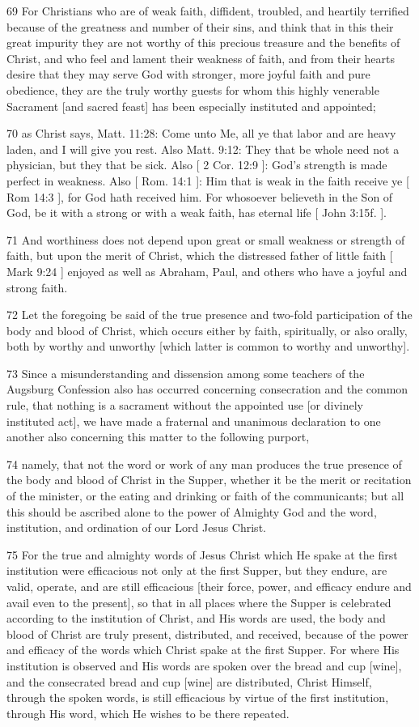 69 For Christians who are of weak faith, diffident, troubled, and heartily terrified because of the greatness and number of their sins, and think that in this their great impurity they are not worthy of this precious treasure and the benefits of Christ, and who feel and lament their weakness of faith, and from their hearts desire that they may serve God with stronger, more joyful faith and pure obedience, they are the truly worthy guests for whom this highly venerable Sacrament [and sacred feast] has been especially instituted and appointed;

70 as Christ says, Matt. 11:28: Come unto Me, all ye that labor and are heavy laden, and I will give you rest. Also Matt. 9:12: They that be whole need not a physician, but they that be sick. Also [ 2 Cor. 12:9 ]: God’s strength is made perfect in weakness. Also [ Rom. 14:1 ]: Him that is weak in the faith receive ye [ Rom 14:3 ], for God hath received him. For whosoever believeth in the Son of God, be it with a strong or with a weak faith, has eternal life [ John 3:15f. ].

71 And worthiness does not depend upon great or small weakness or strength of faith, but upon the merit of Christ, which the distressed father of little faith [ Mark 9:24 ] enjoyed as well as Abraham, Paul, and others who have a joyful and strong faith.

72 Let the foregoing be said of the true presence and two-fold participation of the body and blood of Christ, which occurs either by faith, spiritually, or also orally, both by worthy and unworthy [which latter is common to worthy and unworthy].

73 Since a misunderstanding and dissension among some teachers of the Augsburg Confession also has occurred concerning consecration and the common rule, that nothing is a sacrament without the appointed use [or divinely instituted act], we have made a fraternal and unanimous declaration to one another also concerning this matter to the following purport,

74 namely, that not the word or work of any man produces the true presence of the body and blood of Christ in the Supper, whether it be the merit or recitation of the minister, or the eating and drinking or faith of the communicants; but all this should be ascribed alone to the power of Almighty God and the word, institution, and ordination of our Lord Jesus Christ.

75 For the true and almighty words of Jesus Christ which He spake at the first institution were efficacious not only at the first Supper, but they endure, are valid, operate, and are still efficacious [their force, power, and efficacy endure and avail even to the present], so that in all places where the Supper is celebrated according to the institution of Christ, and His words are used, the body and blood of Christ are truly present, distributed, and received, because of the power and efficacy of the words which Christ spake at the first Supper. For where His institution is observed and His words are spoken over the bread and cup [wine], and the consecrated bread and cup [wine] are distributed, Christ Himself, through the spoken words, is still efficacious by virtue of the first institution, through His word, which He wishes to be there repeated.


